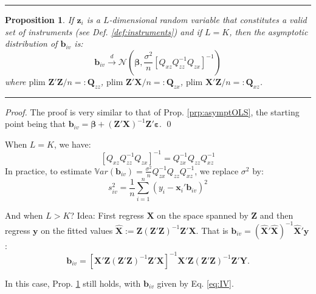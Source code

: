 \documentclass[
]{book}
\newtheorem{proposition}{Proposition}[chapter]
\theoremstyle{definition}
\theoremstyle{definition}
\theoremstyle{definition}
\theoremstyle{definition}
\theoremstyle{remark}
\begin{document}
\begin{center}\rule{0.5\linewidth}{0.5pt}\end{center}

\begin{proposition}
\protect\hypertarget{prp:IV}{}\label{prp:IV}If \(\mathbf{z}_i\) is a \(L\)-dimensional random variable that constitutes a valid set of instruments (see Def. \ref{def:instruments}) and if \(L=K\), then the asymptotic distribution of \(\mathbf{b}_{iv}\) is:
\[
\mathbf{b}_{iv} \overset{d}{\rightarrow} \mathcal{N}\left(\boldsymbol\beta,\frac{\sigma^2}{n}\left[Q_{xz}Q_{zz}^{-1}Q_{zx}\right]^{-1}\right)
\]
where \(\mbox{plim } \mathbf{Z}'\mathbf{Z}/n =: \mathbf{Q}_{zz}\), \(\mbox{plim } \mathbf{Z}'\mathbf{X}/n =: \mathbf{Q}_{zx}\), \(\mbox{plim } \mathbf{X}'\mathbf{Z}/n =: \mathbf{Q}_{xz}\).
\end{proposition}

\begin{center}\rule{0.5\linewidth}{0.5pt}\end{center}

\begin{proof}
The proof is very similar to that of Prop. \ref{prp:asymptOLS}, the starting point being that \(\mathbf{b}_{iv} = \boldsymbol\beta + (\mathbf{Z}'\mathbf{X})^{-1}\mathbf{Z}'\boldsymbol\varepsilon\). \qed
\end{proof}

When \(L=K\), we have:
\[
\left[Q_{xz}Q_{zz}^{-1}Q_{zx}\right]^{-1}=Q_{zx}^{-1}Q_{zz}Q_{xz}^{-1}
\]
In practice, to estimate \(\mathbb{V}ar(\mathbf{b}_{iv}) = \frac{\sigma^2}{n}Q_{zx}^{-1}Q_{zz}Q_{xz}^{-1}\), we replace \(\sigma^2\) by:
\[
s_{iv}^2 = \frac{1}{n}\sum_{i=1}^{n} (y_i - \mathbf{x}_i'\mathbf{b}_{iv})^2
\]

And when \(L > K\)? Idea: First regress \(\mathbf{X}\) on the space spanned by \(\mathbf{Z}\) and then regress \(\mathbf{y}\) on the fitted values \(\hat{\mathbf{X}}:=\mathbf{Z}(\mathbf{Z}'\mathbf{Z})^{-1}\mathbf{Z}'\mathbf{X}\). That is \(\mathbf{b}_{iv} = (\hat{\mathbf{X}}'\hat{\mathbf{X}})^{-1}\hat{\mathbf{X}}'\mathbf{y}\):
\begin{equation}
\boxed{\mathbf{b}_{iv} = [\mathbf{X}'\mathbf{Z}(\mathbf{Z}'\mathbf{Z})^{-1}\mathbf{Z}'\mathbf{X}]^{-1}\mathbf{X}'\mathbf{Z}(\mathbf{Z}'\mathbf{Z})^{-1}\mathbf{Z}'\mathbf{Y}.} \label{eq:IV}
\end{equation}

In this case, Prop. \ref{prp:IV} still holds, with \(\mathbf{b}_{iv}\) given by Eq. \eqref{eq:IV}.
\end{document}
